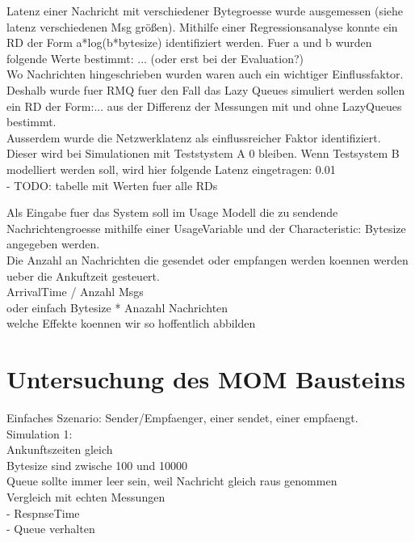 Latenz einer Nachricht mit verschiedener Bytegroesse wurde ausgemessen (siehe latenz verschiedenen Msg größen). Mithilfe einer Regressionsanalyse konnte ein RD der Form a*log(b*bytesize) identifiziert werden. Fuer a und b wurden folgende Werte bestimmt: ... (oder erst bei der Evaluation?) \\

Wo Nachrichten hingeschrieben wurden waren auch ein wichtiger Einflussfaktor. Deshalb wurde fuer RMQ fuer den Fall das Lazy Queues simuliert werden sollen ein RD der Form:... aus der Differenz der Messungen mit und ohne LazyQueues bestimmt. \\

Ausserdem wurde die Netzwerklatenz als einflussreicher Faktor identifiziert. Dieser wird bei Simulationen mit Teststystem A 0 bleiben. Wenn Testsystem B modelliert werden soll, wird hier folgende Latenz eingetragen: 0.01 \\
- TODO: tabelle mit Werten fuer alle RDs

Als Eingabe fuer das System soll im Usage Modell die zu sendende Nachrichtengroesse mithilfe einer UsageVariable und der Characteristic: Bytesize angegeben werden.\\

Die Anzahl an Nachrichten die gesendet oder empfangen werden koennen werden ueber die Ankuftzeit gesteuert.\\
ArrivalTime / Anzahl Msgs \\
oder einfach Bytesize * Anazahl Nachrichten \\









welche Effekte koennen wir so hoffentlich abbilden

\section{Untersuchung des MOM Bausteins}
Einfaches Szenario: Sender/Empfaenger, einer sendet, einer empfaengt.\\
Simulation 1: \\
Ankunftszeiten gleich \\
Bytesize sind zwische 100 und 10000 \\
Queue sollte immer leer sein, weil Nachricht gleich raus genommen \\
Vergleich mit echten Messungen \\
- RespnseTime \\
- Queue verhalten \\

